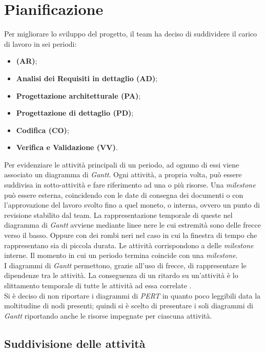 \newpage
\section{Pianificazione}
Per migliorare lo sviluppo del progetto, il team ha deciso di suddividere il carico di lavoro in sei periodi:
\begin{itemize}
	\item \textbf{\AdR (AR)};
	\item \textbf{Analisi dei Requisiti in dettaglio (AD)};
	\item \textbf{Progettazione architetturale (PA)};
	\item \textbf{Progettazione di dettaglio (PD)};
	\item \textbf{Codifica (CO)};
	\item \textbf{Verifica e Validazione (VV)}.
\end{itemize}

Per evidenziare le attività principali di un periodo, ad ognuno di essi viene associato un diagramma di \textit{Gantt}. 
Ogni attività, a propria volta, può essere suddivisa in sotto-attività e fare riferimento ad una o più risorse.
Una \textit{milestone} può essere esterna, coincidendo con le date di consegna dei documenti o con l'approvazione del lavoro svolto fino a quel moneto, o interna, ovvero un punto di revisione stabilito dal team. 
La rappresentazione temporale di queste nel diagramma di \textit{Gantt} avviene mediante linee nere le cui estremità sono delle frecce verso il basso. 
Oppure con dei rombi neri nel caso in cui la finestra di tempo che rappresentano sia di piccola durata. 
Le attività corrispondono a delle \textit{milestone} interne. 
Il momento in cui un periodo termina coincide con una \textit{milestone}.\\
I diagrammi di \textit{Gantt} permettono, grazie all'uso di frecce, di rappresentare le dipendenze tra le attività.
La conseguenza di un ritardo su un'attività è lo slittamento temporale di tutte le attività ad essa correlate . \\
Si è deciso di non riportare i diagrammi di \textit{PERT} in quanto poco leggibili data la moltitudine
di nodi presenti; quindi si è scelto di presentare i soli diagrammi di \textit{Gantt} riportando anche le
risorse impegnate per ciascuna attività.

\subsection{Suddivisione delle attività}

